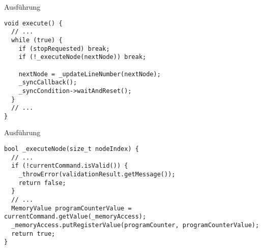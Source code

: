 
\begin{frame}[fragile]{Ausführung}
\begin{lstlisting}[style=C++]
void execute() {
  // ...
  while (true) {
    if (stopRequested) break;
    if (!_executeNode(nextNode)) break;

    nextNode = _updateLineNumber(nextNode);
    _syncCallback();
    _syncCondition->waitAndReset();
  }
  // ...
}
\end{lstlisting}
\end{frame}

\begin{frame}[fragile]{Ausführung}
\begin{lstlisting}[style=C++]
bool _executeNode(size_t nodeIndex) {
  // ...
  if (!currentCommand.isValid()) {
    _throwError(validationResult.getMessage());
    return false;
  }
  // ...
  MemoryValue programCounterValue = currentCommand.getValue(_memoryAccess);
  _memoryAccess.putRegisterValue(programCounter, programCounterValue);
  return true;
}
\end{lstlisting}
\end{frame}
